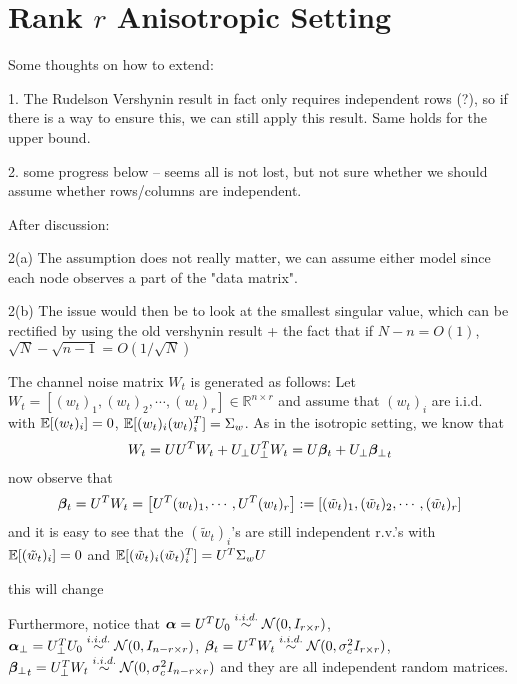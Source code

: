 \documentclass[10pt]{article}
\newcommand{\R}{\mathbb{R}}
\begin{document}
\section{Rank $r$ Anisotropic Setting}

{\color{blue}
Some thoughts on how to extend:

1. The Rudelson Vershynin result in fact only requires independent rows (?), so if there is a way to ensure this, we can still apply this result. Same holds for the upper bound. 

2. some progress below -- seems all is not lost, but not sure whether we should assume whether rows/columns are independent. 

After discussion:

2(a) The assumption does not really matter, we can assume either model since each node observes a part of the "data matrix". 

2(b) The issue would then be to look at the smallest singular value, which can be rectified by using the old vershynin result + the fact that if $N - n = O(1)$, $\sqrt{N} - \sqrt{n-1} = O(1/\sqrt{N})$

}

The channel noise matrix $W_t$ is generated as follows: Let $W_t = [(w_t)_1, (w_t)_2, \cdots, (w_t)_r] \in \R^{n \times r}$ and assume that $(w_t)_i$ are i.i.d. with $\mathbb{E}[(w_t)_i] = 0$, $\mathbb{E}[(w_t)_i (w_t)_i^T] = \Sigma_w$. As in the isotropic setting, we know that
\begin{align*}
W_t = U U^T W_t + U_\perp U_\perp^T W_t = U \bm{\beta}_t + U_\perp {\bm{\beta}_{\perp}}_t
\end{align*}
now observe that 
\begin{align*}
\bm{\beta}_t = U^T W_t = \left[U^T (w_t)_1, \cdots, U^T (w_t)_r \right] := [(\tilde w_t)_1, (\tilde w_t)_2, \cdots, (\tilde w_t)_r]
\end{align*}
and it is easy to see that the $(\tilde w_t)_i$'s are still independent r.v.'s with $\mathbb{E}[(\tilde w_t)_i] = 0$ and $\mathbb{E}[(\tilde w_t)_i (\tilde w_t)_i^T] = U^T\Sigma_w U$

{\color{red} this will change 

Furthermore, notice that $\bm{\alpha} = U^T U_0 \overset{i.i.d.}{\sim} \mathcal{N}(0, I_{r \times r})$, $\bm{\alpha}_{\perp} = U_\perp^T U_0 \overset{i.i.d.}{\sim} \mathcal{N}(0, I_{n- r \times r})$, $\bm{\beta}_t = U^T W_t \overset{i.i.d.}{\sim} \mathcal{N}(0, \sigma_c^2 I_{r \times r})$, ${\bm{\beta}_{\perp}}_t = U_\perp^T W_t \overset{i.i.d.}{\sim} \mathcal{N}(0, \sigma_c^2 I_{n- r \times r})$ and they are all independent random matrices. 
}
\end{document}
